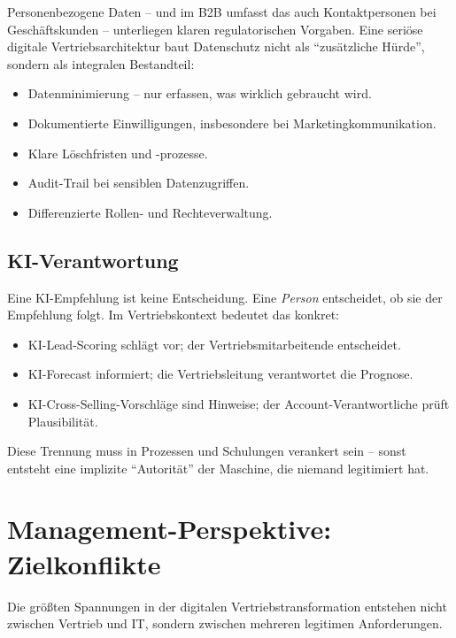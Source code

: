 \documentclass[11pt,a4paper,oneside]{article}
\begin{document}
Personenbezogene Daten -- und im B2B umfasst das auch Kontaktpersonen bei Geschäftskunden -- unterliegen klaren regulatorischen Vorgaben. Eine seriöse digitale Vertriebsarchitektur baut Datenschutz nicht als ``zusätzliche Hürde'', sondern als integralen Bestandteil:

\begin{itemize}
  \item Datenminimierung -- nur erfassen, was wirklich gebraucht wird.
  \item Dokumentierte Einwilligungen, insbesondere bei Marketingkommunikation.
  \item Klare Löschfristen und -prozesse.
  \item Audit-Trail bei sensiblen Datenzugriffen.
  \item Differenzierte Rollen- und Rechteverwaltung.
\end{itemize}

\subsection{KI-Verantwortung}

Eine KI-Empfehlung ist keine Entscheidung. Eine \emph{Person} entscheidet, ob sie der Empfehlung folgt. Im Vertriebskontext bedeutet das konkret:

\begin{itemize}
  \item KI-Lead-Scoring schlägt vor; der Vertriebsmitarbeitende entscheidet.
  \item KI-Forecast informiert; die Vertriebsleitung verantwortet die Prognose.
  \item KI-Cross-Selling-Vorschläge sind Hinweise; der Account-Verantwortliche prüft Plausibilität.
\end{itemize}

Diese Trennung muss in Prozessen und Schulungen verankert sein -- sonst entsteht eine implizite ``Autorität'' der Maschine, die niemand legitimiert hat.

\section{Management-Perspektive: Zielkonflikte}

Die größten Spannungen in der digitalen Vertriebstransformation entstehen nicht zwischen Vertrieb und IT, sondern zwischen mehreren legitimen Anforderungen.
\end{document}
